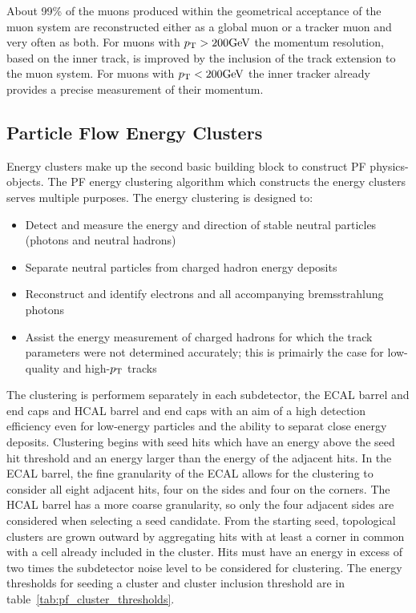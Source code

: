 About 99\% of the muons produced within the geometrical acceptance of the muon system are 
reconstructed either as a global muon or a tracker muon and very often as both.
For muons with $p_\mathrm{T} > 200\mathrm{GeV}$ the momentum resolution, based on the inner track, is 
improved by the inclusion of the track extension to the muon system.
For muons with $p_\mathrm{T} < 200\mathrm{GeV}$ the inner tracker already provides a precise measurement of 
their momentum.



\subsection{Particle Flow Energy Clusters}
Energy clusters make up the second basic building block to construct PF physics-objects. The PF energy
clustering algorithm which constructs the energy clusters serves multiple purposes. The energy clustering
is designed to:
\begin{itemize}
\item Detect and measure the energy and direction of stable neutral particles (photons and neutral hadrons)
\item Separate neutral particles from charged hadron energy deposits
\item Reconstruct and identify electrons and all accompanying bremsstrahlung photons
\item Assist the energy measurement of charged hadrons for which the track parameters were not 
determined accurately; this is primairly the case for low-quality and high-$p_\mathrm{T}$ tracks
\end{itemize}
The clustering is performem separately in each subdetector, the ECAL barrel and end caps and HCAL barrel
and end caps with an aim of a high detection efficiency even for low-energy particles and the ability to 
separat close energy deposits. Clustering begins with seed hits which have an energy above the seed hit
threshold and an energy larger than the energy of the adjacent hits. In the ECAL barrel, the fine 
granularity of the ECAL allows
for the clustering to consider all eight adjacent hits, four on the sides and four on the corners.
The HCAL barrel has a more coarse granularity, so only the four adjacent sides are considered when
selecting a seed candidate. From the starting seed, topological clusters are grown outward by aggregating
hits with at least a corner in common with a cell already included in the cluster. Hits must have an energy
in excess of two times the subdetector noise level to be considered for clustering. The energy thresholds
for seeding a cluster and cluster inclusion threshold are in table~\ref{tab:pf_cluster_thresholds}.


